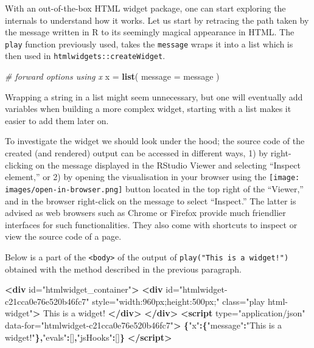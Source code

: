 \documentclass[10pt,]{krantz}
\makeatletter
\newenvironment{Shaded}{\begin{snugshade}}{\end{snugshade}}
\newcommand{\CommentTok}[1]{\textcolor[rgb]{0.37,0.37,0.37}{\textit{#1}}}
\newcommand{\DataTypeTok}[1]{\textcolor[rgb]{0.27,0.27,0.27}{#1}}
\newcommand{\KeywordTok}[1]{\textcolor[rgb]{0.27,0.27,0.27}{\textbf{#1}}}
\newcommand{\NormalTok}[1]{#1}
\newcommand{\OperatorTok}[1]{\textcolor[rgb]{0.43,0.43,0.43}{\textbf{#1}}}
\newcommand{\OtherTok}[1]{\textcolor[rgb]{0.37,0.37,0.37}{#1}}
\newcommand{\StringTok}[1]{\textcolor[rgb]{0.5,0.5,0.5}{#1}}
\newenvironment{kframe}{%
\medskip{}
\setlength{\fboxsep}{.8em}
 \def\at@end@of@kframe{}%
 \ifinner\ifhmode%
  \def\at@end@of@kframe{\end{minipage}}%
  \begin{minipage}{\columnwidth}%
 \fi\fi%
 \def\FrameCommand##1{\hskip\@totalleftmargin \hskip-\fboxsep
 \colorbox{shadecolor}{##1}\hskip-\fboxsep
     \hskip-\linewidth \hskip-\@totalleftmargin \hskip\columnwidth}%
 \MakeFramed {\advance\hsize-\width
   \@totalleftmargin\z@ \linewidth\hsize
   \@setminipage}}%
 {\par\unskip\endMakeFramed%
 \at@end@of@kframe}
\renewenvironment{Shaded}{\begin{kframe}}{\end{kframe}}
\makeatother
\begin{document}
With an out-of-the-box HTML widget package, one can start exploring the internals to understand how it works. Let us start by retracing the path taken by the message written in R to its seemingly magical appearance in HTML. The \texttt{play} function previously used, takes the \texttt{message} wraps it into a list which is then used in \texttt{htmlwidgets::createWidget}.

\begin{Shaded}
\begin{Highlighting}[]
\CommentTok{# forward options using x}
\NormalTok{x =}\StringTok{ }\KeywordTok{list}\NormalTok{(}
  \DataTypeTok{message =}\NormalTok{ message}
\NormalTok{)}
\end{Highlighting}
\end{Shaded}

Wrapping a string in a list might seem unnecessary, but one will eventually add variables when building a more complex widget, starting with a list makes it easier to add them later on.

To investigate the widget we should look under the hood; the source code of the created (and rendered) output can be accessed in different ways, 1) by right-clicking on the message displayed in the RStudio Viewer and selecting ``Inspect element,'' or 2) by opening the visualisation in your browser using the \texttt{[image: images/open-in-browser.png]} button located in the top right of the ``Viewer,'' and in the browser right-click on the message to select ``Inspect.'' The latter is advised as web browsers such as Chrome or Firefox provide much friendlier interfaces for such functionalities. They also come with shortcuts to inspect or view the source code of a page.

Below is a part of the \texttt{\textless{}body\textgreater{}} of the output of \texttt{play("This\ is\ a\ widget!")} obtained with the method described in the previous paragraph.

\begin{Shaded}
\begin{Highlighting}[]
\KeywordTok{<div}\OtherTok{ id=}\StringTok{"htmlwidget_container"}\KeywordTok{>}
  \KeywordTok{<div} 
\OtherTok{    id=}\StringTok{"htmlwidget-c21cca0e76e520b46fc7"} 
\OtherTok{    style=}\StringTok{"width:960px;height:500px;"} 
\OtherTok{    class=}\StringTok{"play html-widget"}\KeywordTok{>}
\NormalTok{    This is a widget!}
  \KeywordTok{</div>}
\KeywordTok{</div>}
\KeywordTok{<script} 
\OtherTok{  type=}\StringTok{"application/json"} 
\OtherTok{  data-for=}\StringTok{"htmlwidget-c21cca0e76e520b46fc7"}\KeywordTok{>}
  \OperatorTok{\{}\StringTok{"x"}\OperatorTok{:\{}\StringTok{"message"}\OperatorTok{:}\StringTok{"This is a widget!"}\OperatorTok{\},}\StringTok{"evals"}\OperatorTok{:}\NormalTok{[]}\OperatorTok{,}\StringTok{"jsHooks"}\OperatorTok{:}\NormalTok{[]}\OperatorTok{\}}
\KeywordTok{</script>}
\end{Highlighting}
\end{Shaded}
\end{document}
